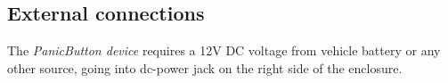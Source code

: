 \subsection{External connections}
The \emph{PanicButton device} requires a 12V DC voltage from vehicle battery or any other source, going into dc-power jack on the right side of the enclosure.



